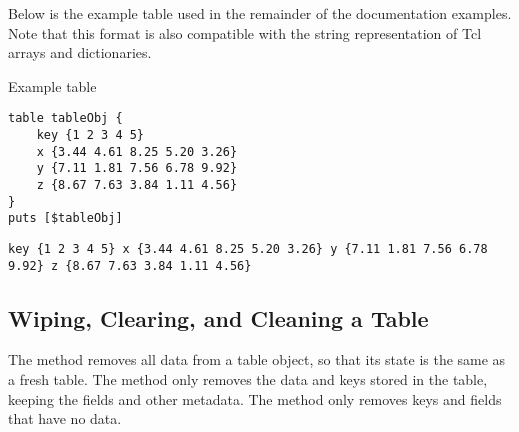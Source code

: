 \documentclass{article}
\begin{document}
Below is the example table used in the remainder of the documentation examples.
Note that this format is also compatible with the string representation of Tcl arrays and dictionaries.
\begin{example}{Example table}
\begin{lstlisting}
table tableObj {
    key {1 2 3 4 5} 
    x {3.44 4.61 8.25 5.20 3.26}
    y {7.11 1.81 7.56 6.78 9.92}
    z {8.67 7.63 3.84 1.11 4.56}
}
puts [$tableObj]
\end{lstlisting}
\tcblower
\begin{lstlisting}
key {1 2 3 4 5} x {3.44 4.61 8.25 5.20 3.26} y {7.11 1.81 7.56 6.78 9.92} z {8.67 7.63 3.84 1.11 4.56}
\end{lstlisting}
\end{example}

\subsection{Wiping, Clearing, and Cleaning a Table}
The method  removes all data from a table object, so that its state is the same as a fresh table.
The method  only removes the data and keys stored in the table, keeping the fields and other metadata.
The method  only removes keys and fields that have no data.
\begin{syntax}
\end{syntax}
\begin{syntax}
\end{syntax}
\begin{syntax}
\end{syntax}


\clearpage
\end{document}
